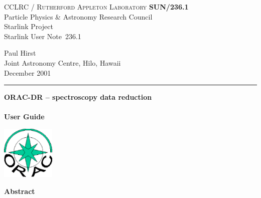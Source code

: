 \documentclass[twoside,11pt]{article}
\newcommand{\stardoccategory}  {Starlink User Note}
\newcommand{\stardocinitials}  {SUN}
\newcommand{\stardocnumber}    {236.1}
\newcommand{\stardocauthors}   {Paul Hirst \\
                                Joint Astronomy Centre, Hilo, Hawaii}
\newcommand{\stardocdate}      {December 2001}
\newcommand{\stardoctitle}     {ORAC-DR -- spectroscopy data reduction}
\newcommand{\stardocversion}   {}
\newcommand{\stardocmanual}    {User Guide}
\newcommand{\stardocname}{\stardocinitials /\stardocnumber}
\newenvironment{latexonly}{}{}
\renewcommand{\_}{\texttt{\symbol{95}}}
\begin{document}
\setcounter{secnumdepth}{5}
\thispagestyle{empty}

\begin{latexonly}
   CCLRC / \textsc{Rutherford Appleton Laboratory} \hfill \textbf{\stardocname}\\
   {\large Particle Physics \& Astronomy Research Council}\\
   {\large Starlink Project\\}
   {\large \stardoccategory\ \stardocnumber}
   \begin{flushright}
   \stardocauthors\\
   \stardocdate
   \end{flushright}
   \vspace{-4mm}
   \rule{\textwidth}{0.5mm}
   \vspace{5mm}
   \begin{center}
   {\Huge\textbf{\stardoctitle \\ [2.5ex]}}
   {\LARGE\textbf{\stardocversion \\ [4ex]}}
   {\Huge\textbf{\stardocmanual}}
   \end{center}
   \vspace{5mm}

\begin{center}
\includegraphics[width=1.0in]{sun236_logo.eps}
\end{center}

   \vspace{10mm}
   \begin{center}
      {\Large\textbf{Abstract}}
   \end{center}
\end{latexonly}
\end{document}
